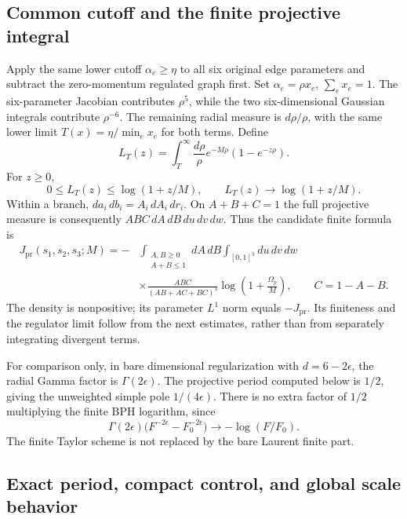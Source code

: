 \subsection{Common cutoff and the finite projective integral}

Apply the same lower cutoff $\alpha_e\ge\eta$ to all six original edge
parameters and subtract the zero-momentum regulated graph first. Set
$\alpha_e=\rho x_e$, $\sum_e x_e=1$. The six-parameter Jacobian contributes
$\rho^5$, while the two six-dimensional Gaussian integrals contribute
$\rho^{-6}$. The remaining radial measure is $d\rho/\rho$, with the
same lower limit $T(x)=\eta/\min_e x_e$ for both terms.
Define
\[
 L_T(z)=\int_T^\infty\frac{d\rho}{\rho}
                  e^{-M\rho}(1-e^{-z\rho}).
\]
For $z\ge0$,
\[
 0\le L_T(z)\le\log(1+z/M),\qquad
 L_T(z)\longrightarrow\log(1+z/M).
\]
Within a branch, $da_i\,db_i=A_i\,dA_i\,dr_i$. On $A+B+C=1$ the full
projective measure is consequently
$ABC\,dA\,dB\,du\,dv\,dw$. Thus the candidate finite formula is
\begin{align*}
 J_{\mathrm{pr}}(s_1,s_2,s_3;M)
 =-&\int_{\substack{A,B\ge0\\A+B\le1}}dA\,dB
       \int_{[0,1]^3}du\,dv\,dw\\
 &\times\frac{ABC}{(AB+AC+BC)^3}
           \log\left(1+\frac{\Omega_p}{M}\right),
 \qquad C=1-A-B.
\end{align*}
The density is nonpositive; its parameter $L^1$ norm equals
$-J_{\mathrm{pr}}$. Its finiteness and the regulator limit follow from
the next estimates, rather than from separately integrating divergent terms.

For comparison only, in bare dimensional regularization with
$d=6-2\epsilon$, the radial Gamma factor is $\Gamma(2\epsilon)$. The
projective period computed below is $1/2$, giving the unweighted simple
pole $1/(4\epsilon)$. There is no extra factor of $1/2$ multiplying the
finite BPH logarithm, since
\[
 \Gamma(2\epsilon)
 \bigl(F^{-2\epsilon}-F_0^{-2\epsilon}\bigr)
 \longrightarrow-\log(F/F_0).
\]
The finite Taylor scheme is not replaced by the bare Laurent finite part.

\subsection{Exact period, compact control, and global scale behavior}

